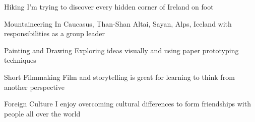 
\begin{cvskills}

  \cvskill
    {Hiking} %
    {I’m trying to discover every hidden corner of Ireland on foot} %

  \cvskill
    {Mountaineering} %
    {In Caucasus, Than-Shan Altai, Sayan, Alps, Iceland with responsibilities as a group leader} %

  \cvskill
    {Painting and Drawing} %
    {Exploring ideas visually and using paper prototyping techniques} %

  \cvskill
    {Short Filmmaking} %
    {Film and storytelling is great for learning to think from another perspective} %

  \cvskill
    {Foreign Culture} %
    {I enjoy overcoming cultural differences to form friendships with people all over the world} %


\end{cvskills}

